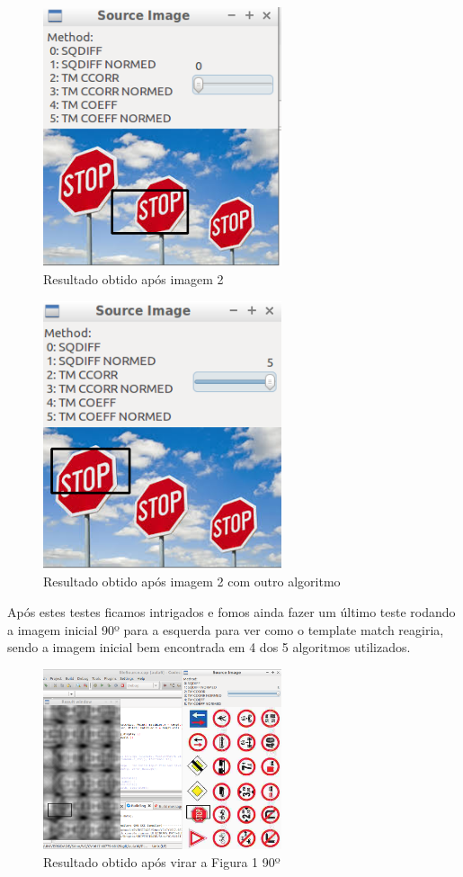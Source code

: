 \documentclass[portuguese, times, mirror]{revdetua}
\begin{document}
\begin{figure}[ht!]
\centering
\includegraphics[width=70mm]{img/ex1_2.png}
\caption{Resultado obtido após imagem 2}
\end{figure}

\begin{figure}[ht!]
\centering
\includegraphics[width=70mm]{img/ex1_3.png}
\caption{Resultado obtido após imagem 2 com outro algoritmo}
\end{figure}

\newpage

Após estes testes ficamos intrigados e fomos ainda fazer um último teste rodando a imagem inicial 90º para a esquerda para ver como o template match reagiria, sendo a imagem inicial bem encontrada em 4 dos 5 algoritmos utilizados.

\begin{figure}[ht!]
\centering
\includegraphics[width=70mm]{img/ex1_4.png}
\caption{Resultado obtido após virar a Figura 1 90º}
\end{figure}
\end{document}
